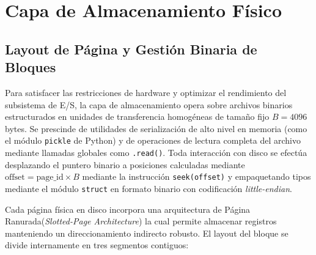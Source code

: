 \documentclass[a4paper,12pt]{article}
\begin{document}
\section{Capa de Almacenamiento Físico}

\subsection{Layout de Página y Gestión Binaria de Bloques}

Para satisfacer las restricciones de hardware y optimizar el rendimiento del subsistema de E/S, la capa de almacenamiento opera sobre archivos binarios estructurados en unidades de transferencia homogéneas de tamaño fijo $B = 4096$ bytes. Se prescinde de utilidades de serialización de alto nivel en memoria (como el módulo \texttt{pickle} de Python) y de operaciones de lectura completa del archivo mediante llamadas globales como \texttt{.read()}. Toda interacción con disco se efectúa desplazando el puntero binario a posiciones calculadas mediante $\text{offset} = \text{page\_id} \times B$ mediante la instrucción \texttt{seek(offset)} y empaquetando tipos mediante el módulo \texttt{struct} en formato binario con codificación \textit{little-endian}.

Cada página física en disco incorpora una arquitectura de Página Ranurada(\textit{Slotted-Page Architecture}) la cual permite almacenar registros manteniendo un direccionamiento indirecto robusto. El layout del bloque se divide internamente en tres segmentos contiguos:
\end{document}
